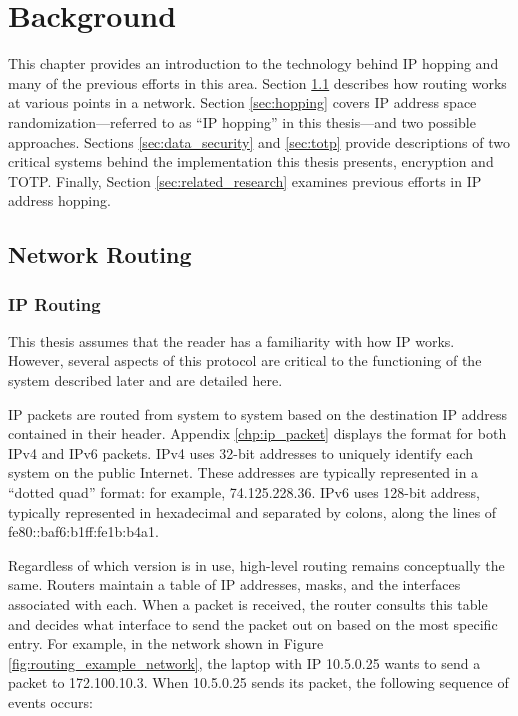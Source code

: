 \chapter{Background}
\label{chp:background}
\par This chapter provides an introduction to the technology behind \ac{IP} hopping and many of the previous efforts in this area. Section \ref{sec:routing} describes how routing works at various points in a network. Section \ref{sec:hopping} covers IP address space randomization---referred to as ``\ac{IP} hopping'' in this thesis---and two possible approaches. Sections \ref{sec:data_security} and \ref{sec:totp} provide descriptions of two critical systems behind the implementation this thesis presents, encryption and \ac{TOTP}. Finally, Section \ref{sec:related_research} examines previous efforts in \ac{IP} address hopping.

\section{Network Routing}
\label{sec:routing}

\subsection{\ac{IP} Routing}
\label{sec:ip_routing}
\par This thesis assumes that the reader has a familiarity with how \ac{IP} works. However, several aspects of this protocol are critical to the functioning of the system described later and are detailed here. 

\par \ac{IP} packets are routed from system to system based on the destination \ac{IP} address contained in their header. Appendix \ref{chp:ip_packet} displays the format for both \ac{IPv4} and \ac{IPv6} packets. \ac{IPv4} uses 32-bit addresses to uniquely identify each system on the public Internet. These addresses are typically represented in a ``dotted quad'' format: for example, 74.125.228.36. \ac{IPv6} uses 128-bit address, typically represented in hexadecimal and separated by colons, along the lines of fe80::baf6:b1ff:fe1b:b4a1.

\par Regardless of which version is in use, high-level routing remains conceptually the same. Routers maintain a table of \ac{IP} addresses, masks, and the interfaces associated with each. When a packet is received, the router consults this table and decides what interface to send the packet out on based on the most specific entry. For example, in the network shown in Figure \ref{fig:routing_example_network}, the laptop with \ac{IP} 10.5.0.25 wants to send a packet to 172.100.10.3. When 10.5.0.25 sends its packet, the following sequence of events occurs:

